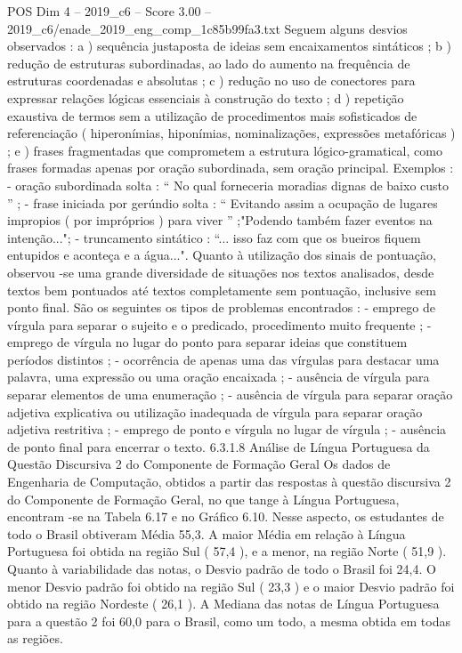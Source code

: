 \begin{textsample}{POS Dim 4 – 2019\_c6 – Score 3.00 – 2019\_c6/enade\_2019\_eng\_comp\_1c85b99fa3.txt}
Seguem alguns desvios observados : a ) sequência justaposta de ideias sem encaixamentos sintáticos ; b ) redução de estruturas subordinadas, ao lado do aumento na frequência de estruturas coordenadas e absolutas ; c ) redução no uso de conectores para expressar relações lógicas essenciais à construção do texto ; d ) repetição exaustiva de termos sem a utilização de procedimentos mais sofisticados de referenciação ( hiperonímias, hiponímias, nominalizações, expressões metafóricas ) ; e ) frases fragmentadas que comprometem a estrutura lógico-gramatical, como frases formadas apenas por oração subordinada, sem oração principal.
Exemplos : - oração subordinada solta : “ No qual forneceria moradias dignas de baixo custo ” ; - frase iniciada por gerúndio solta : “ Evitando assim a ocupação de lugares impropios ( por impróprios ) para viver ” ;"Podendo também fazer eventos na intenção..."; - truncamento sintático : “... isso faz com que os bueiros fiquem entupidos e aconteça e a água...".
Quanto à utilização dos sinais de pontuação, observou -se uma grande diversidade de situações nos textos analisados, desde textos bem pontuados até textos completamente sem pontuação, inclusive sem ponto final.
São os seguintes os tipos de problemas encontrados : - emprego de vírgula para separar o sujeito e o predicado, procedimento muito frequente ; - emprego de vírgula no lugar do ponto para separar ideias que constituem períodos distintos ; - ocorrência de apenas uma das vírgulas para destacar uma palavra, uma expressão ou uma oração encaixada ; - ausência de vírgula para separar elementos de uma enumeração ; - ausência de vírgula para separar oração adjetiva explicativa ou utilização inadequada de vírgula para separar oração adjetiva restritiva ; - emprego de ponto e vírgula no lugar de vírgula ; - ausência de ponto final para encerrar o texto. 6.3.1.8 Análise de Língua Portuguesa da Questão Discursiva 2 do Componente de Formação Geral Os dados de Engenharia de Computação, obtidos a partir das respostas à questão discursiva 2 do Componente de Formação Geral, no que tange à Língua Portuguesa, encontram -se na Tabela 6.17 e no Gráfico 6.10.
Nesse aspecto, os estudantes de todo o Brasil obtiveram Média 55,3.
A maior Média em relação à Língua Portuguesa foi obtida na região Sul ( 57,4 ), e a menor, na região Norte ( 51,9 ).
Quanto à variabilidade das notas, o Desvio padrão de todo o Brasil foi 24,4.
O menor Desvio padrão foi obtido na região Sul ( 23,3 ) e o maior Desvio padrão foi obtido na região Nordeste ( 26,1 ).
A Mediana das notas de Língua Portuguesa para a questão 2 foi 60,0 para o Brasil, como um todo, a mesma obtida em todas as regiões.

\end{textsample}
